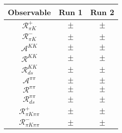\begin{tabular}{ccc}
Observable & Run 1 & Run 2 \\
\midrule
$\mathcal{R}_{\pi K}^+$ & $\pm$ & $\pm$ \\
$\mathcal{R}_{\pi K}^-$ & $\pm$ & $\pm$ \\
$\mathcal{A}^{KK}$ & $\pm$ & $\pm$ \\
$\mathcal{R}^{KK}$ & $\pm$ & $\pm$ \\
$\mathcal{R}_{ds}^{KK}$ & $\pm$ & $\pm$ \\
$\mathcal{A}^{\pi\pi}$ & $\pm$ & $\pm$ \\
$\mathcal{R}^{\pi\pi}$ & $\pm$ & $\pm$ \\
$\mathcal{R}_{ds}^{\pi\pi}$ & $\pm$ & $\pm$ \\
$\mathcal{R}_{\pi K\pi\pi}^+$ & $\pm$ & $\pm$ \\
$\mathcal{R}_{\pi K\pi\pi}^-$ & $\pm$ & $\pm$ \\
\end{tabular}
